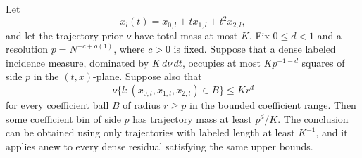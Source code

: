 \begin{lemma}\label{lem:scalar-clustering}
Let
\[
 x_l(t)=x_{0,l}+t x_{1,l}+t^2x_{2,l},
\]
and let the trajectory prior \(\nu\) have total mass at most \(K\).
Fix \(0\le d<1\) and a resolution \(p=N^{-c+o(1)}\), where \(c>0\)
is fixed.  Suppose that a dense labeled incidence measure, dominated
by \(K\,d\nu\,dt\), occupies at most \(Kp^{-1-d}\) squares of side \(p\)
in the \((t,x)\)-plane.  Suppose also that
\begin{equation}\label{a04:coefficient-cap}
 \nu\{l:(x_{0,l},x_{1,l},x_{2,l})\in B\}\le K r^d
\end{equation}
for every coefficient ball \(B\) of radius \(r\ge p\) in the bounded
coefficient range.  Then some coefficient bin of side \(p\) has
trajectory mass at least \(p^d/K\).
The conclusion can be obtained using only trajectories with labeled
length at least \(K^{-1}\), and it applies anew to every dense residual
satisfying the same upper bounds.
\end{lemma}

